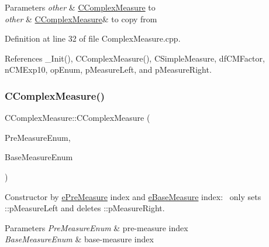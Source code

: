 \begin{DoxyParams}{Parameters}
{\em other} & \hyperlink{classCComplexMeasure}{C\+Complex\+Measure} to \\
\hline
{\em other} & \hyperlink{classCComplexMeasure}{C\+Complex\+Measure}\& to copy from \\
\hline
\end{DoxyParams}


Definition at line 32 of file Complex\+Measure.\+cpp.



References \+\_\+\+Init(), C\+Complex\+Measure(), C\+Simple\+Measure, df\+C\+M\+Factor, n\+C\+M\+Exp10, op\+Enum, p\+Measure\+Left, and p\+Measure\+Right.

\mbox{\label{classCComplexMeasure_a0a0946c508c95e4baf22a0bd5831c1b8}} 
\subsubsection{\texorpdfstring{C\+Complex\+Measure()}{CComplexMeasure()}\hspace{0.1cm}{\footnotesize\ttfamily [3/4]}}
{\footnotesize\ttfamily C\+Complex\+Measure\+::\+C\+Complex\+Measure (\begin{DoxyParamCaption}\item[{const \hyperlink{PreMeasure_8h_a6c81167b8d4c2badde42f81cb7214620}{e\+Pre\+Measure}}]{Pre\+Measure\+Enum,  }\item[{const \hyperlink{BaseMeasure_8h_ac90e5164ccf1f0d648fba7e94b229a11}{e\+Base\+Measure}}]{Base\+Measure\+Enum }\end{DoxyParamCaption})}



Constructor by \hyperlink{PreMeasure_8h_a6c81167b8d4c2badde42f81cb7214620}{e\+Pre\+Measure} index and \hyperlink{BaseMeasure_8h_ac90e5164ccf1f0d648fba7e94b229a11}{e\+Base\+Measure} index\+:~\newline
 only sets \+::p\+Measure\+Left and deletes \+::p\+Measure\+Right. 


\begin{DoxyParams}{Parameters}
{\em Pre\+Measure\+Enum} & pre-\/measure index \\
\hline
{\em Base\+Measure\+Enum} & base-\/measure index \\
\hline
\end{DoxyParams}



